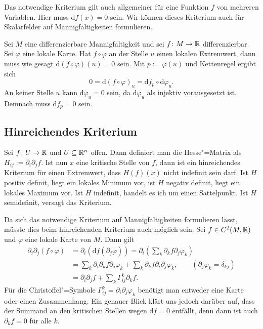 Das notwendige Kriterium gilt auch allgemeiner für eine Funktion $f$
von mehreren Variablen. Hier muss $\mathrm df(x)=0$ sein.
Wir können dieses Kriterium auch für Skalarfelder auf
Mannigfaltigkeiten formulieren.

Sei $M$ eine differenzierbare Mannigfaltigkeit und sei
$f\colon M\to\mathbb R$ differenzierbar. Sei $\varphi$ eine lokale
Karte. Hat $f\circ\varphi$ an der Stelle $u$ einen lokalen Extremwert,
dann muss wie gesagt $\mathrm d(f\circ\varphi)(u)=0$ sein.
Mit $p:=\varphi(u)$ und Kettenregel ergibt sich%
\begin{equation}
0 = \mathrm d(f\circ\varphi)_u = \mathrm df_p\circ\mathrm d\varphi_u.
\end{equation}
An keiner Stelle $u$ kann $\mathrm d\varphi_u=0$ sein, da
$\mathrm d\varphi_u$ als injektiv vorausgesetzt ist. Demnach muss
$\mathrm df_p=0$ sein.


\subsection{Hinreichendes Kriterium}

Sei $f\colon U\to\mathbb R$ und $U\subseteq\mathbb R^n$ offen. Dann definiert
man die Hesse"=Matrix als $H_{ij}:=\partial_i\partial_j f$.
Ist nun $x$ eine kritische Stelle von $f$, dann ist ein
hinreichendes Kriterium für einen Extremwert, dass $H(f)(x)$ nicht
indefinit sein darf. Ist $H$ positiv definit, liegt ein lokales
Minimum vor, ist $H$ negativ definit, liegt ein lokales Maximum
vor. Ist $H$ indefinit, handelt es ich um einen Sattelpunkt.
Ist $H$ semidefinit, versagt das Kriterium.

Da sich das notwendige Kriterium auf Mannigfaltigkeiten formulieren
lässt, müsste dies beim hinreichenden Kriterium auch möglich sein.
Sei $f\in C^2(M,\mathbb R)$ und $\varphi$ eine lokale Karte von $M$. Dann
gilt%
\begin{align}
\partial_i\partial_j(f\circ\varphi)
&= \partial_i(\mathrm df(\partial_j\varphi))
= \partial_i(\sum_k \partial_k f\partial_j\varphi_k)\\
&= \sum_k \partial_i\partial_k f\partial_j\varphi_k
+ \sum_k \partial_k f\partial_i\partial_j\varphi_k,
\qquad (\partial_j\varphi_k=\delta_{kj})\\
&= \partial_i\partial_j f + \sum_k\Gamma_{ij}^k\partial_k f.
\end{align}
Für die Christoffel"=Symbole
$\Gamma_{ij}^k = \partial_i\partial_j\varphi_k$
benötigt man entweder eine Karte oder einen Zusammenhang.
Ein genauer Blick klärt uns jedoch darüber auf, dass der Summand
an den kritischen Stellen wegen $\mathrm df=0$ entfällt, denn
dann ist auch $\partial_k f=0$ für alle $k$.

